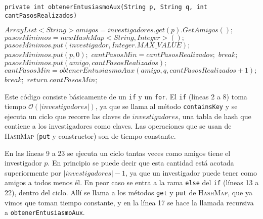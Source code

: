 \documentclass[12pt, a4paper,english,spanish]{article}
\begin{document}
\begin{itemize}
\begin{small}
\texttt{private int obtenerEntusiasmoAux(String p, String q, int cantPasosRealizados)}
\begin{algorithmic}[1]
\State $ArrayList<String> amigos = investigadores.get(p).GetAmigos();$
 
	\State $pasosMinimos = new HashMap<String, Integer>();$ 
	 
		\State $pasosMinimos.put(investigador, Integer.MAX\_VALUE);$ 
	\EndFor
	\State $pasosMinimos.put(p, 0);$ 
\EndIf
{} 
	 
		\State $cantPasosMin = cantPasosRealizados;$ 
		\State $break;$ 
	\Else
		 
			 
				\State $pasosMinimos.put(amigo, cantPasosRealizados);$ 
				\State $cantPasosMin = obtenerEntusiasmoAux(amigo,q,cantPasosRealizados+1);$ 	
			\EndIf
		\Else
			\State $break;$ 
		\EndIf	
	\EndIf
\EndFor
\State $return \; cantPasosMin;$ 
\end{algorithmic}
\bigskip
\end{small}

Este c\'odigo consiste b\'asicamente de un \texttt{if} y un \texttt{for}. El \texttt{if} (l\'ineas 2 a 8) toma tiempo $\mathcal{O}(|investigadores|)$, ya que se llama al m\'etodo \texttt{containsKey} y se ejecuta un ciclo que recorre las claves de $investigadores$, una tabla de hash que contiene a los investigadores como claves. Las operaciones que se usan de \textsc{HashMap} (\texttt{put} y constructor)\cite{java} son de tiempo constante.

En las l\'ineas 9 a 23 se ejecuta un ciclo tantas veces como amigos tiene el investigador $p$. En principio se puede decir que esta cantidad est\'a acotada superiormente por $|investigadores|-1$, ya que un investigador puede tener como amigos a todos menos \'el. En peor caso se entra a la rama \texttt{else} del \texttt{if} (l\'ineas 13 a 22), dentro del ciclo. All\'i se llama a los m\'etodos \texttt{get} y \texttt{put} de \textsc{HashMap}, que ya vimos que toman tiempo constante, y en la l\'inea 17 se hace la llamada recursiva a \texttt{obtenerEntusiasmoAux}. 


\end{itemize}
\end{document}
